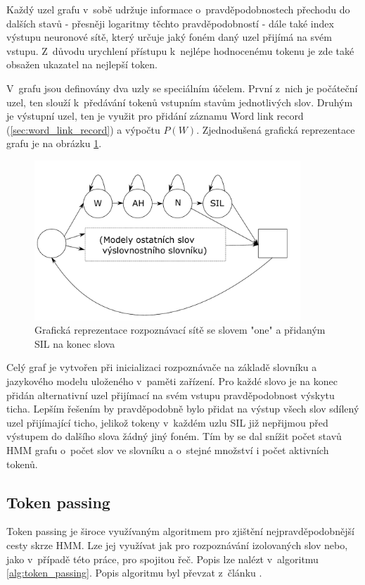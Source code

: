 Každý uzel grafu v~sobě udržuje informace o~pravděpodobnostech přechodu do dalších stavů - přesněji logaritmy těchto pravděpodobností - dále také index výstupu neuronové sítě, který určuje jaký foném daný uzel přijímá na svém vstupu. Z~důvodu urychlení přístupu k~nejlépe hodnocenému tokenu je zde také obsažen ukazatel na nejlepší token. 

V~grafu jsou definovány dva uzly se speciálním účelem. První z~nich je počáteční uzel, ten slouží k~předávání tokenů vstupním stavům jednotlivých slov. Druhým je výstupní uzel, ten je využit pro přidání záznamu Word link record (\ref{sec:word_link_record}) a výpočtu $P(W)$. Zjednodušená grafická reprezentace grafu je na obrázku  \ref{fig:one_hmm_sil}.

\begin{figure}[H]\label{fig:one_hmm_sil}
	\centering
		\includegraphics[height=6cm]{obrazky-figures/hmm_network.pdf}
        \caption{Grafická reprezentace rozpoznávací sítě se slovem "one" a přidaným SIL na konec slova}
\end{figure}

Celý graf je vytvořen při inicializaci rozpoznávače na základě slovníku a jazykového modelu uloženého v~paměti zařízení. Pro každé slovo je na konec přidán alternativní uzel přijímací na svém vstupu pravděpodobnost výskytu ticha. Lepším řešením by pravděpodobně bylo přidat na výstup všech slov sdílený uzel přijímající ticho, jelikož tokeny v~každém uzlu SIL již nepřijmou před výstupem do dalšího slova žádný jiný foném. Tím by se dal snížit počet stavů HMM grafu o~počet slov ve slovníku a o~stejné množství i počet aktivních tokenů.

\subsection{Token passing}
Token passing je široce využívaným algoritmem pro zjištění nejpravděpodobnější cesty skrze HMM. Lze jej využívat jak pro rozpoznávání izolovaných slov nebo, jako v~případě této práce, pro spojitou řeč. Popis lze nalézt v~algoritmu \ref{alg:token_passing}. Popis algoritmu byl převzat z~článku \cite{YoungN1989TokenP}.

